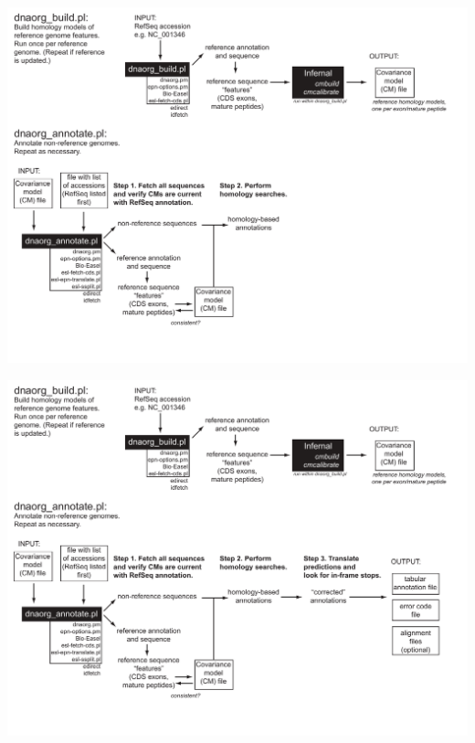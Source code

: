 \documentclass[landscape]{slides}
\begin{document}
\begin{slide}
\includegraphics[width=10in]{figs/dnaorg-scripts-annotate3}
\vfill
\end{slide}
\begin{slide}
\includegraphics[width=10in]{figs/dnaorg-scripts-annotate4}
\vfill
\end{slide}
\end{document}
